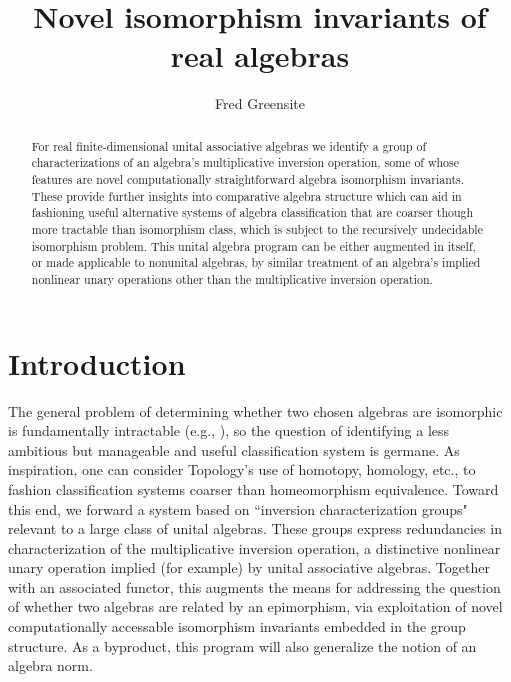 \documentclass{amsart}
\numberwithin{equation}{section}
\theoremstyle{definition}
\numberwithin{theorem}{section}
\begin{document}
       
             \title{Novel isomorphism invariants of real algebras}
    \author{Fred Greensite}
    
   \begin{abstract}  For real finite-dimensional unital associative algebras we identify a group of characterizations of an algebra's multiplicative inversion operation, some of whose features are novel computationally straightforward algebra isomorphism invariants.  These provide further insights into comparative algebra structure which can aid in fashioning useful alternative systems of algebra classification that are coarser though more tractable than isomorphism class, which is subject to the recursively undecidable isomorphism problem.  This unital algebra program can be either augmented in itself, or made applicable to nonunital algebras, by similar treatment of an algebra's implied nonlinear unary operations other than the multiplicative inversion operation.
   \end{abstract}
        
  \maketitle
  
 
  \section{Introduction} The general problem of determining whether two chosen algebras are isomorphic is fundamentally intractable (e.g., \cite{drozd:1972,prest:1991,belitskii:2003}), so the question of identifying a  less ambitious but manageable and useful classification system is germane.  As inspiration, one can consider Topology's use of homotopy, homology, etc., to fashion classification systems coarser than homeomorphism equivalence.  Toward this end, we forward a system based on  ``inversion characterization groups" relevant to a large class of unital algebras.  These groups express redundancies in characterization of the multiplicative inversion operation, a distinctive nonlinear unary operation implied (for example) by unital associative algebras. Together with an associated functor, this augments the means for addressing the question of whether two algebras are related by an epimorphism, via exploitation of novel computationally accessable isomorphism invariants embedded in the group structure. 
    As a byproduct, this program will also generalize the notion of an algebra norm. 
  
\end{document}
